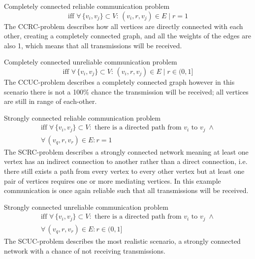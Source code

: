 \begin{description}[labelindent=\parindent,itemsep=2em]
    \item[CCRC-problem:] Completely connected reliable communication problem   
    \begin{equation}
    \text{iff } \forall\, \{v_i, v_j\} \subset V: \, (v_i,r,v_j)\in E \mid r = 1    
    \end{equation}
    The CCRC-problem describes how all vertices are directly connected with each other, creating a completely connected graph, and all the weights of the edges are also 1, which means that all transmissions will be received. 
    
    \item[CCUC-problem:] Completely connected unreliable communication problem
    \begin{equation}
    \text{iff } \forall\, \{v_i, v_j\} \subset V: \, (v_i,r,v_j)\in E \mid r \in (0, 1]
    \end{equation}
    The CCUC-problem describes a completely connected graph however in this scenario there is not a 100\% chance the transmission will be received; all vertices are still in range of each-other. 
    
    \item[SCRC-problem:] Strongly connected reliable communication problem
    \begin{equation}
    \begin{gathered}
    \text{iff } \forall\, \{v_i, v_j\} \subset V: \text{ there is a directed path from } v_i \text{ to } v_j\; \land \\ \forall\, (v_q, r, v_r) \in E : r = 1
    \end{gathered}  
    \end{equation}   
    The SCRC-problem describes a strongly connected network meaning at least one vertex has an indirect connection to another rather than a direct connection, i.e. there still exists a path from every vertex to every other vertex but at least one pair of vertices requires one or more mediating vertices. In this example communication is once again reliable such that all transmissions will be received. 
    
    \item[SCUC-problem:] Strongly connected unreliable communication problem
    \begin{equation}
    \begin{gathered}
    \text{iff } \forall\, \{v_i, v_j\} \subset V: \text{ there is a directed path from } v_i \text{ to } v_j\; \land \\ \forall\, (v_q, r, v_r) \in E : r \in (0, 1]
    \end{gathered}  
    \end{equation}    
    The SCUC-problem describes the most realistic scenario, a strongly connected network with a chance of not receiving transmissions. 
\end{description}
